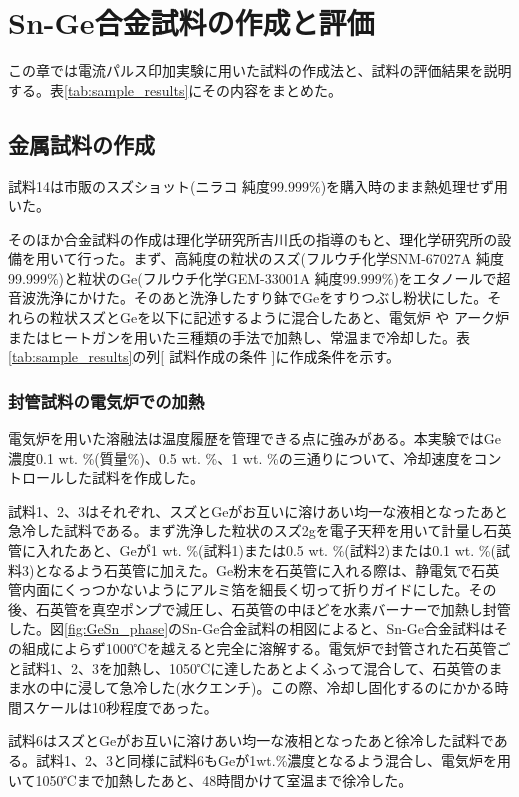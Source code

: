 \section{Sn-Ge合金試料の作成と評価}
この章では電流パルス印加実験に用いた試料の作成法と、試料の評価結果を説明する。表\ref{tab:sample_results}にその内容をまとめた。

\subsection{金属試料の作成}
試料14は市販のスズショット(ニラコ 純度99.999\%)を購入時のまま熱処理せず用いた。

そのほか合金試料の作成は理化学研究所吉川氏の指導のもと、理化学研究所の設備を用いて行った。まず、高純度の粒状のスズ(フルウチ化学SNM-67027A 純度99.999\%)と粒状のGe(フルウチ化学GEM-33001A 純度99.999\%)をエタノールで超音波洗浄にかけた。そのあと洗浄したすり鉢でGeをすりつぶし粉状にした。それらの粒状スズとGeを以下に記述するように混合したあと、電気炉%
や
アーク炉%
またはヒートガンを用いた三種類の手法で加熱し、常温まで冷却した。表\ref{tab:sample_results}の列[ 試料作成の条件 ]に作成条件を示す。

\subsubsection{封管試料の電気炉での加熱}
電気炉を用いた溶融法は温度履歴を管理できる点に強みがある。本実験ではGe濃度0.1 wt. \%(質量\%)、0.5 wt. \%、1 wt. \%の三通りについて、冷却速度をコントロールした試料を作成した。

試料1、2、3はそれぞれ、スズとGeがお互いに溶けあい均一な液相となったあと急冷した試料である。まず洗浄した粒状のスズ2gを電子天秤を用いて計量し石英管に入れたあと、Geが1 wt. \%(試料1)または0.5 wt. \%(試料2)または0.1 wt. \%(試料3)となるよう石英管に加えた。Ge粉末を石英管に入れる際は、静電気で石英管内面にくっつかないようにアルミ箔を細長く切って折りガイドにした。その後、石英管を真空ポンプで減圧し、石英管の中ほどを水素バーナーで加熱し封管した。図\ref{fig:GeSn_phase}のSn-Ge合金試料の相図によると、Sn-Ge合金試料はその組成によらず1000℃を越えると完全に溶解する。電気炉で封管された石英管ごと試料1、2、3を加熱し、1050℃に達したあとよくふって混合して、石英管のまま水の中に浸して急冷した(水クエンチ)。この際、冷却し固化するのにかかる時間スケールは10秒程度であった。

試料6はスズとGeがお互いに溶けあい均一な液相となったあと徐冷した試料である。試料1、2、3と同様に試料6もGeが1wt.\%濃度となるよう混合し、電気炉を用いて1050℃まで加熱したあと、48時間かけて室温まで徐冷した。


